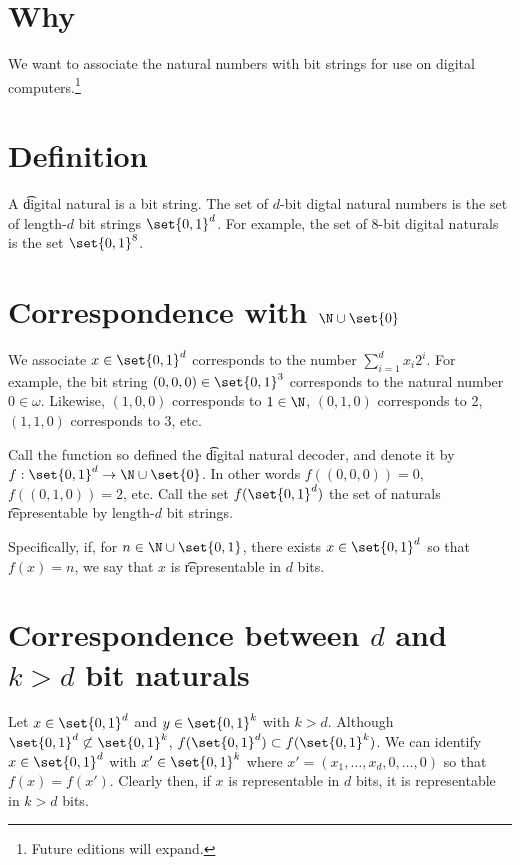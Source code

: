 

\section*{Why}

We want to associate the natural numbers with bit strings for use on digital computers.\footnote{Future editions will expand.}

\section*{Definition}

A \t{digital natural} is a bit string.
The set of \t{$d$-bit digtal natural numbers} is the set of length-$d$ bit strings $\set{0, 1}^d$.
For example, the set of 8-bit digital naturals is the set $\set{0, 1}^8$.

\section*{Correspondence with $\N  \cup \set{0}$}

We associate $x \in \set{0, 1}^d$ corresponds to the number $\sum_{i = 1}^{d} x_i 2^i$.
For example, the bit string $(0,0,0) \in \set{0, 1}^3$ corresponds to the natural number $0 \in \omega $.
Likewise, $(1, 0, 0)$ corresponds to $1 \in \N $, $(0, 1, 0)$ corresponds to 2, $(1, 1, 0)$ corresponds to 3, etc.

Call the function so defined the \t{digital natural decoder}, and denote it by $f: \set{0, 1}^d \to \N  \cup \set{0}$.
In other words $f((0, 0, 0)) = 0$, $f((0, 1, 0)) = 2$, etc.
Call the set $f(\set{0, 1}^d)$ the set of naturals \t{representable} by length-$d$ bit strings.

Specifically, if, for $n \in \N  \cup \set{0, 1}$, there exists $x \in \set{0, 1}^d$ so that $f(x) = n$, we say that $x$ is \t{representable in $d$ bits}.

\section*{Correspondence between $d$ and $k > d$ bit naturals}

Let $x \in \set{0, 1}^d$ and $y \in \set{0, 1}^k$ with $k > d$.
Although $\set{0, 1}^d \not\subset \set{0, 1}^k$, $f(\set{0, 1}^d) \subset f(\set{0, 1}^k)$.
We can identify $x \in \set{0, 1}^d$ with $x' \in \set{0, 1}^k$ where $x' = (x_1, \dots , x_d, 0, \dots , 0)$ so that $f(x) = f(x')$.
Clearly then, if $x$ is representable in $d$ bits, it is representable in $k > d$ bits.

